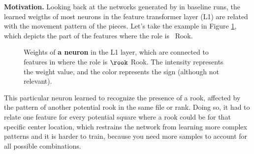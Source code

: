 \textbf{Motivation.} Looking back at the networks generated by  in baseline runs, the learned weigths of most neurons in the feature transformer layer (L1) are related with the movement pattern of the pieces. Let's take the example in Figure \ref{fig:rook_weights}, which depicts the  part of the features where the role is \symrook\ Rook.

\begin{figure}[h]
\centering
{}%
\qquad
{}%
\caption{Weights of \textbf{a neuron} in the L1 layer, which are connected to features in  where the role is $\rook$ Rook. The intensity represents the weight value, and the color represents the sign (although not relevant).}
\label{fig:rook_weights}
\end{figure}

This particular neuron learned to recognize the presence of a rook, affected by the pattern of another potential rook in the same file or rank. Doing so, it had to relate one feature for every potential square where a rook could be for that specific center location, which restrains the network from learning more complex patterns and it is harder to train, because you need more samples to account for all possible combinations.

